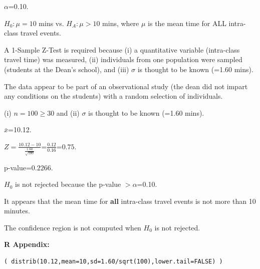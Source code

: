 \documentclass[10pt,openany]{book}\usepackage[]{graphicx}\usepackage[]{color}
\makeatletter
\newenvironment{kframe}{%
 \def\at@end@of@kframe{}%
 \ifinner\ifhmode%
  \def\at@end@of@kframe{\end{minipage}}%
  \begin{minipage}{\columnwidth}%
 \fi\fi%
 \def\FrameCommand##1{\hskip\@totalleftmargin \hskip-\fboxsep
 \colorbox{shadecolor}{##1}\hskip-\fboxsep
     \hskip-\linewidth \hskip-\@totalleftmargin \hskip\columnwidth}%
 \MakeFramed {\advance\hsize-\width
   \@totalleftmargin\z@ \linewidth\hsize
   \@setminipage}}%
 {\par\unskip\endMakeFramed%
 \at@end@of@kframe}
\newenvironment{knitrout}{}{} %
\makeatother
\begin{document}
\vspace{-12pt}
\begin{Enumerate}
  \item $\alpha$=0.10.
  \item $H_{0}:\mu=10$ mins vs. $H_{A}:\mu>10$ mins, where $\mu$ is the mean time for ALL intra-class travel events.
  \item A 1-Sample Z-Test is required because (i) a quantitative variable (intra-class travel time) was measured, (ii) individuals from one population were sampled (students at the Dean's school), and (iii) $\sigma$ is thought to be known (=1.60 mins).
  \item The data appear to be part of an observational study (the dean did not impart any conditions on the students) with a random selection of individuals.
  \item (i) $n=100\geq30$ and (ii) $\sigma$ is thought to be known (=1.60 mins).
  \item $\bar{x}$=10.12.
  \item $Z=\frac{10.12-10}{\frac{1.60}{\sqrt{100}}}$=$\frac{0.12}{0.16}$=$0.75$.
  \item p-value=$0.2266$.
  \item $H_{0}$ is not rejected because the p-value $>\alpha$=0.10.
  \item It appears that the mean time for \textbf{all} intra-class travel events is not more than 10 minutes.
  \item The confidence region is not computed when $H_{0}$ is not rejected.
\end{Enumerate}

\begin{minipage}{\textwidth}
\textbf{R Appendix:}
\vspace*{-6pt}
\begin{knitrout}
\color{fgcolor}\begin{kframe}
\begin{verbatim}
( distrib(10.12,mean=10,sd=1.60/sqrt(100),lower.tail=FALSE) )
\end{verbatim}
\end{kframe}
\end{knitrout}
\end{minipage}
\end{document}
